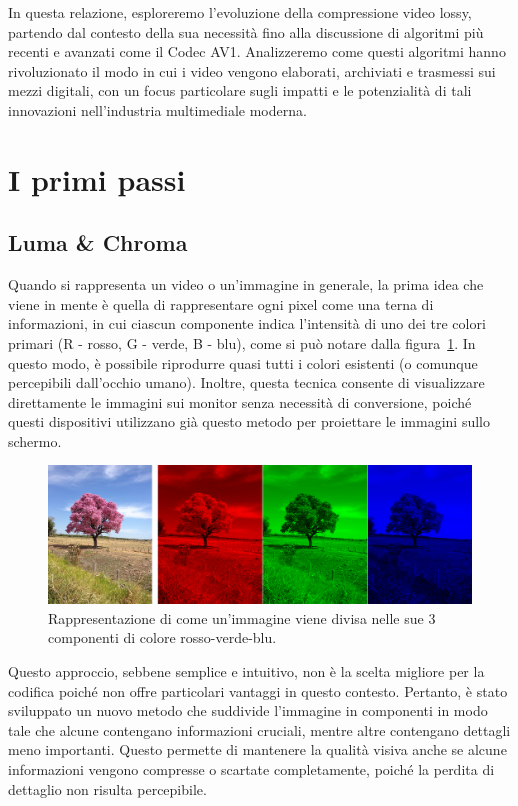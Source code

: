 \documentclass[a4paper,12pt, oneside]{article}
\begin{document}
In questa relazione, esploreremo l'evoluzione della compressione video lossy, partendo dal
contesto della sua necessità fino alla discussione di algoritmi più recenti e avanzati come il
Codec AV1. Analizzeremo come questi algoritmi hanno rivoluzionato il modo in cui i video
vengono elaborati, archiviati e trasmessi sui mezzi digitali, con un focus particolare sugli
impatti e le potenzialità di tali innovazioni nell'industria multimediale moderna.

\section{I primi passi}
\subsection{Luma \& Chroma}
Quando si rappresenta un video o un'immagine in generale, la prima idea che viene in mente è quella di
rappresentare ogni pixel come una terna di informazioni, in cui ciascun componente indica l'intensità
di uno dei tre colori primari (R - rosso, G - verde, B - blu), come si può notare dalla
figura~\ref{fig:n_rgb}. In questo modo, è possibile riprodurre quasi tutti i colori esistenti (o
comunque percepibili dall'occhio umano). Inoltre, questa tecnica consente di visualizzare direttamente
le immagini sui monitor senza necessità di conversione, poiché questi dispositivi utilizzano già questo
metodo per proiettare le immagini sullo schermo.

\begin{figure}[h]
    \centering
    \includegraphics[width=1\textwidth]{images/n-rgb.png}
    \caption{Rappresentazione di come un'immagine viene divisa nelle sue 3 componenti di colore rosso-verde-blu.}
    \label{fig:n_rgb}
\end{figure}

Questo approccio, sebbene semplice e intuitivo, non è la scelta migliore per la codifica poiché non
offre particolari vantaggi in questo contesto. Pertanto, è stato sviluppato un nuovo metodo che
suddivide l'immagine in componenti in modo tale che alcune contengano informazioni cruciali, mentre
altre contengano dettagli meno importanti. Questo permette di mantenere la qualità visiva anche se
alcune informazioni vengono compresse o scartate completamente, poiché la perdita di dettaglio non
risulta percepibile.
\end{document}
